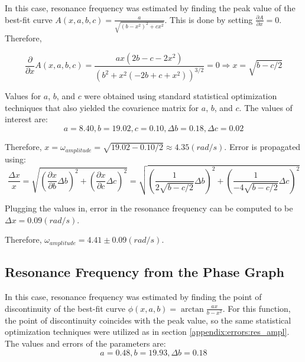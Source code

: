 In this case, resonance frequency was estimated by finding the peak value of the best-fit curve $A(x, a, b, c) = \frac{a}{\sqrt{(b-x^2)^2 + cx^2}}$. This is done by setting $\frac{\partial A}{\partial x} = 0$. Therefore,

\begin{equation*}
  \frac{\partial}{\partial x} A(x, a, b, c) = \frac{ax(2b-c-2x^2)}{( b^2 + x^2 (-2b + c + x^2) )^{3/2}} = 0 \Rightarrow x = \sqrt{b - c/2}
\end{equation*}

Values for $a$, $b$, and $c$ were obtained using standard statistical optimization techniques that also yielded the covarience matrix for $a$, $b$, and $c$. The values of interest are:
\begin{equation*}
  a = 8.40, b = 19.02, c = 0.10, \Delta b = 0.18, \Delta c = 0.02
\end{equation*}

Therefore, $x = \omega_{amplitude} = \sqrt{19.02 - 0.10 /2} \approx 4.35 (rad/s)$. Error is propagated using:
\begin{equation*}
  \frac{\Delta x}{x} = \sqrt{ \left( \frac{\partial x}{\partial b} \Delta b \right)^2 + \left( \frac{\partial x}{\partial c} \Delta c \right)^2} = \sqrt{ \left( \frac{1}{2\sqrt{b - c/2}} \Delta b \right)^2 + \left( \frac{1}{-4\sqrt{b-c/2}} \Delta c \right)^2} 
\end{equation*}

Plugging the values in, error in the resonance frequency can be computed to be $\Delta {x} = 0.09 (rad/s)$.

Therefore, $\omega_{amplitude} = 4.41 \pm 0.09 (rad/s)$.

\subsection{ Resonance Frequency from the Phase Graph } \label{appendix:errors:res_phase}

In this case, resonance frequency was estimated by finding the point of discontinuity of the best-fit curve $\phi(x, a, b) = \arctan \frac{ax}{b - x^2}$. For this function, the point of discontinuity coincides with the peak value, so the same statistical optimization techniques were utilized as in section \ref{appendix:errors:res_ampl}. The values and errors of the parameters are:
\begin{equation*}
  a=0.48, b = 19.93, \Delta b = 0.18
\end{equation*}

